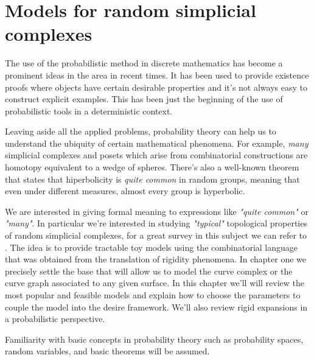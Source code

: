 
\chapter{Models for random simplicial complexes} %

\label{Chapter2} %



The use of the probabilistic method in discrete mathematics has become a prominent ideas in the area in recent times. It has been used to provide existence proofs where objects have certain desirable properties and it's not always easy to construct explicit examples. This has been just the beginning of the use of probabilistic tools in a deterministic context.

Leaving aside all the applied problems, probability theory can help us to understand the ubiquity of certain mathematical phenomena. For example, \textit{many} simplicial complexes and posets which arise from combinatorial constructions are homotopy equivalent to a wedge of spheres. There's also a well-known theorem that states that hiperbolicity is \textit{quite common} in random groups, meaning that even under different measures, almost every group is hyperbolic.

We are interested in giving formal meaning to expressions like \textit{"quite common"} or \textit{"many"}. In particular we're interested in studying \textit{"typical"} topological properties of random simplicial complexes, for a great survey in this subject we can refer to \cite[M. Khale]{surveyStochastic}. The idea is to provide tractable toy models using the combinatorial language that was obtained from the translation of rigidity phenomena. In chapter one we precisely settle the base that will allow us to model the curve complex or the curve graph associated to any given surface. In this chapter we'll will review the most popular and feasible models and explain how to choose the parameters to couple the model into the desire framework. We'll also review rigid expansions in a probabilistic perspective.

Familiarity with basic concepts in probability theory such as probability spaces, random variables, and basic theorems will be assumed.

